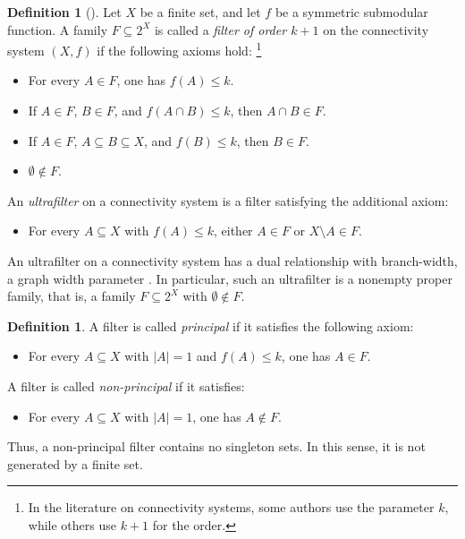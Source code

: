 \documentclass[10pt]{book}
\theoremstyle{definition}
\newtheorem{definition}[theorem]{Definition}
\begin{document}
\begin{definition}[\cite{16}]
Let \(X\) be a finite set, and let \(f\) be a symmetric submodular function.  
A family \(F\subseteq 2^X\) is called a \emph{filter of order \(k+1\)} on the connectivity system \((X,f)\) if the following axioms hold:
\footnote{In the literature on connectivity systems, some authors use the parameter \(k\), while others use \(k+1\) for the order.}
\begin{itemize}
    \item[(Q0)] For every \(A\in F\), one has \(f(A)\leq k\).
    \item[(Q1)] If \(A\in F\), \(B\in F\), and \(f(A\cap B)\leq k\), then \(A\cap B\in F\).
    \item[(Q2)] If \(A\in F\), \(A\subseteq B\subseteq X\), and \(f(B)\leq k\), then \(B\in F\).
    \item[(Q3)] \(\emptyset\notin F\).
\end{itemize}

An \emph{ultrafilter} on a connectivity system is a filter satisfying the additional axiom:
\begin{itemize}
    \item[(Q4)] For every \(A\subseteq X\) with \(f(A)\leq k\), either \(A\in F\) or \(X\setminus A\in F\).
\end{itemize}

An ultrafilter on a connectivity system has a dual relationship with branch-width, a graph width parameter \cite{16}.  
In particular, such an ultrafilter is a nonempty proper family, that is, a family \(F\subseteq 2^X\) with \(\emptyset\notin F\).
\end{definition}

\begin{definition}\cite{16}
A filter is called \emph{principal} if it satisfies the following axiom:
\begin{itemize}
    \item[(QP5)] For every \(A\subseteq X\) with \(|A|=1\) and \(f(A)\leq k\), one has \(A\in F\).
\end{itemize}

A filter is called \emph{non-principal} if it satisfies:
\begin{itemize}
    \item[(Q5)] For every \(A\subseteq X\) with \(|A|=1\), one has \(A\notin F\).
\end{itemize}
Thus, a non-principal filter contains no singleton sets. In this sense, it is not generated by a finite set.
\end{definition}
\end{document}
